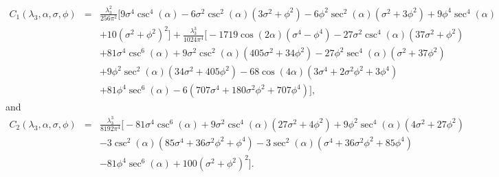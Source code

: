 \documentclass[11pt,a4paper,english,superscriptaddress,preprint,aps,prd]{revtex4}
\begin{document}
\begin{eqnarray}\label{coef1}
C_1(\lambda_3,\alpha,\sigma,\phi)&=& 
\frac{\lambda_3^2}{256 \pi ^2} \Big[ 9 \sigma ^4 \csc ^4(\alpha )-6 \sigma ^2 \csc ^2(\alpha ) \left(3 \sigma ^2+\phi ^2\right)-6 \phi ^2 \sec ^2(\alpha ) \left(\sigma ^2+3 \phi ^2\right)+9 \phi ^4 \sec ^4(\alpha ) \nonumber\\
&&+10 \left(\sigma ^2+\phi ^2\right)^2\Big] +\frac{\lambda_3^3}{1024 \pi ^4} \Big[ -1719 \cos (2 \alpha ) \left(\sigma ^4-\phi ^4\right)-27 \sigma ^2 \csc ^4(\alpha ) \left(37 \sigma ^2+\phi ^2\right)\nonumber\\
&&+81 \sigma ^4 \csc ^6(\alpha )+9 \sigma ^2 \csc ^2(\alpha ) \left(405 \sigma ^2+34 \phi ^2\right)
-27 \phi ^2 \sec ^4(\alpha ) \left(\sigma ^2+37 \phi ^2\right)\nonumber\\
&& +9 \phi ^2 \sec ^2(\alpha ) \left(34 \sigma ^2+405 \phi ^2\right)-68 \cos (4 \alpha ) \left(3 \sigma ^4+2 \sigma ^2 \phi ^2+3 \phi ^4\right)\nonumber\\
&&+81 \phi ^4 \sec ^6(\alpha )-6 \left(707 \sigma ^4+180 \sigma ^2 \phi ^2+707 \phi ^4\right)\Big],
\end{eqnarray}
\noindent and 
\begin{eqnarray}\label{coef2}
C_2(\lambda_3,\alpha,\sigma,\phi)&=& \frac{\lambda_3^3 }{8192 \pi ^4} \Big[ -81 \sigma ^4 \csc ^6(\alpha )+9 \sigma ^2 \csc ^4(\alpha ) \left(27 \sigma ^2+4 \phi ^2\right)+9 \phi ^2 \sec ^4(\alpha ) \left(4 \sigma ^2+27 \phi ^2\right)\nonumber\\
&&-3 \csc ^2(\alpha ) \left(85 \sigma ^4+36 \sigma ^2 \phi ^2+\phi ^4\right)-3 \sec ^2(\alpha ) \left(\sigma ^4+36 \sigma ^2 \phi ^2+85 \phi ^4\right)\nonumber\\
&&-81 \phi ^4 \sec ^6(\alpha )+100 \left(\sigma ^2+\phi ^2\right)^2\Big].
\end{eqnarray}
\end{document}
